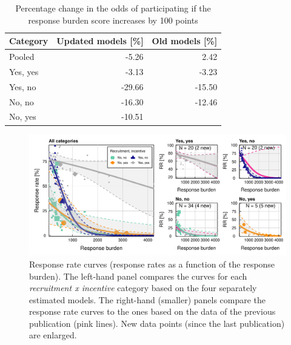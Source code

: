 \documentclass[a4paper]{article}\usepackage[]{graphicx}\usepackage[]{xcolor}
\makeatletter
\def\maxwidth{ %
  \ifdim\Gin@nat@width>\linewidth
    \linewidth
  \else
    \Gin@nat@width
  \fi
}
\newenvironment{knitrout}{}{} %
\makeatother
\begin{document}
\begin{table}
\centering
\caption{\label{tab:pc_odds}Percentage change in the odds of participating if the response burden score increases by 100 points}
\centering
\fontsize{9}{11}\selectfont
\begin{tabular}[t]{lrr}
\toprule
Category & Updated models [\%] & Old models [\%]\\
\midrule
Pooled & -5.26 & 2.42\\
Yes, yes & -3.13 & -3.23\\
Yes, no & -29.66 & -15.50\\
No, no & -16.30 & -12.46\\
No, yes & -10.51 & \\
\bottomrule
\end{tabular}
\end{table}



\begin{figure}[h!]
\begin{knitrout}
\color{fgcolor}

{\centering \includegraphics[width=\maxwidth]{figure/unnamed-chunk-20-1} 

}


\end{knitrout}
\caption{Response rate curves (response rates as a function of the response burden). The left-hand panel compares the curves for each \textit{recruitment x incentive} category based on the four separately estimated models. The right-hand (smaller) panels compare the response rate curves to the ones based on the data of the previous publication (pink lines). New data points (since the last publication) are enlarged.}
\label{fig:response_curves}
\end{figure}
\end{document}
